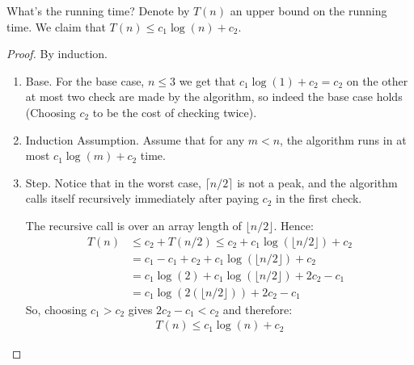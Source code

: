 What's the running time? Denote by $T\left( n \right)$ an upper bound on the running time. We claim that $T(n) \le c_{1} \log (n) + c_{2}$. 
\begin{proof}
  By induction. 
\begin{enumerate}
  \item Base. For the base case, $n \le 3$ we get that $c_{1} \log(1) + c_{2} =  c_{2}$ on the other at most two check are made by the algorithm, so indeed the base case holds (Choosing $c_{2}$ to be the cost of checking twice).
  \item Induction Assumption. Assume that for any $m < n$, the algorithm runs in at most $c_{1} \log(m) + c_{2}$ time.
  \item Step. Notice that in the worst case, $\lceil n/2 \rceil$ is not a peak, and the algorithm calls itself recursively immediately after paying $c_{2}$ in the first check.

    The recursive call is over an array length of $\lfloor n/2 \rfloor$. Hence:
    \begin{equation*}
      \begin{split}    
	T\left(n\right) & \le c_{2} + T\left(n/2\right) \le c_{2} + c_{1} \log\left( \lfloor n/2 \rfloor \right) + c_{2}\\
	& = c_{1} - c_{1} + c_{2} + c_{1} \log\left( \lfloor n/2 \rfloor \right) + c_{2}\\
  & = c_{1} \log (2) +  c_{1} \log\left( \lfloor n/2 \rfloor  \right) + 2c_{2} - c_{1} \\
	& = c_{1} \log\left(2 \left(\lfloor n/2 \rfloor \right) \right) + 2c_{2} - c_{1}
      \end{split}
    \end{equation*}
    So, choosing $c_{1} > c_{2}$ gives $2c_{2} - c_{1} < c_{2}$ and therefore:
    \begin{equation*}
      \begin{split}
	T\left(n\right) \le c_{1} \log \left( n  \right) + c_{2}  
      \end{split}
    \end{equation*}
\end{enumerate}
\end{proof}




